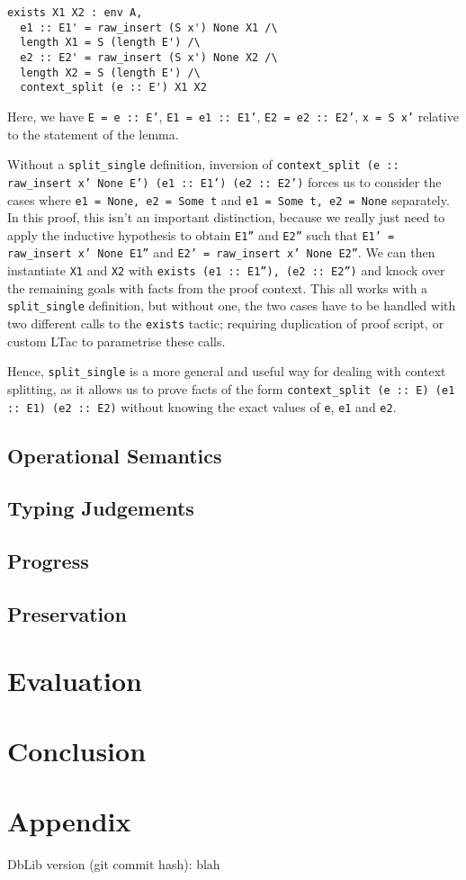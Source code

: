 \documentclass[]{unswthesis}
\let\c\texttt
\begin{document}
\begin{verbatim}
exists X1 X2 : env A,
  e1 :: E1' = raw_insert (S x') None X1 /\
  length X1 = S (length E') /\
  e2 :: E2' = raw_insert (S x') None X2 /\
  length X2 = S (length E') /\
  context_split (e :: E') X1 X2
\end{verbatim}

Here, we have \c{E = e :: E'}, \c{E1 = e1 :: E1'}, \c{E2 = e2 :: E2'}, \c{x = S x'} relative to the statement of the lemma.

Without a \c{split_single} definition, inversion of \c{context_split (e :: raw_insert x' None E') (e1 :: E1') (e2 :: E2')} forces us to consider the cases where \c{e1 = None, e2 = Some t} and \c{e1 = Some t, e2 = None} separately. In this proof, this isn't an important distinction, because we really just need to apply the inductive hypothesis to obtain \c{E1''} and \c{E2''} such that \c{E1' = raw_insert x' None E1''} and \c{E2' = raw_insert x' None E2''}. We can then instantiate \c{X1} and \c{X2} with \c{exists (e1 :: E1''), (e2 :: E2'')} and knock over the remaining goals with facts from the proof context. This all works with a \c{split_single} definition, but without one, the two cases have to be handled with two different calls to the \c{exists} tactic; requiring duplication of proof script, or custom LTac to parametrise these calls.

Hence, \c{split_single} is a more general and useful way for dealing with context splitting, as it allows us to prove facts of the form \c{context_split (e :: E) (e1 :: E1) (e2 :: E2)} without knowing the exact values of \c{e}, \c{e1} and \c{e2}.

\section{Operational Semantics}

\section{Typing Judgements}

\section{Progress}

\section{Preservation}

\chapter{Evaluation}

\chapter{Conclusion}



\backmatter
\pagebreak



\chapter{Appendix}

DbLib version (git commit hash): blah
\end{document}

